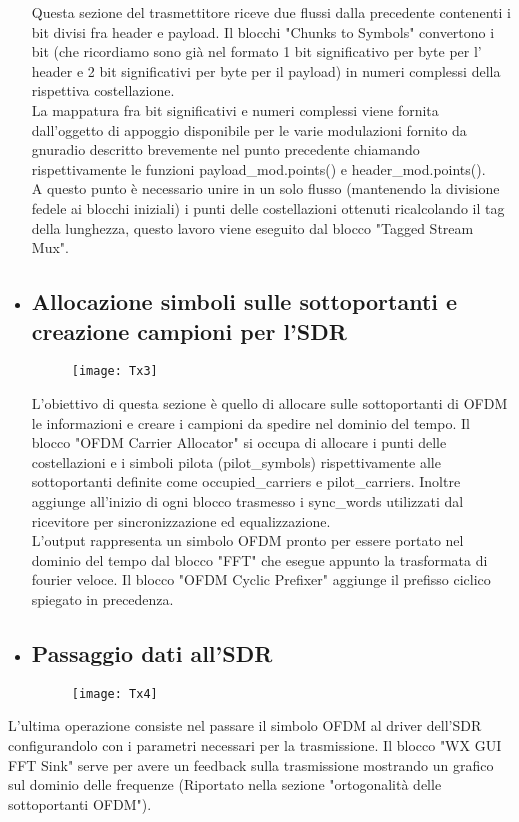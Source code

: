 \begin{itemize}
 Questa sezione del trasmettitore riceve due flussi dalla precedente contenenti i bit divisi fra header e payload. Il blocchi "Chunks to Symbols" convertono i bit (che ricordiamo sono già nel formato 1 bit significativo per byte per l' header e 2 bit significativi per byte per il payload) in numeri complessi della rispettiva costellazione.\\ La mappatura fra bit significativi e numeri complessi viene fornita dall'oggetto di appoggio disponibile per le varie modulazioni fornito da gnuradio descritto brevemente nel punto precedente chiamando rispettivamente le funzioni payload\_mod.points() e header\_mod.points().\\ A questo punto è necessario unire in un solo flusso (mantenendo la divisione fedele ai blocchi iniziali) i punti delle costellazioni ottenuti ricalcolando il tag della lunghezza, questo lavoro viene eseguito dal blocco "Tagged Stream Mux".
 	\item \subsection{Allocazione simboli sulle sottoportanti e creazione campioni per l'SDR}
 	\begin{figure}[h]
 		\raggedleft
 		\texttt{[image: Tx3]}
 		\caption{}
 	\end{figure}
 L'obiettivo di questa sezione è quello di allocare sulle sottoportanti di OFDM le informazioni e creare i campioni da spedire nel dominio del tempo. Il blocco "OFDM Carrier Allocator" si occupa di allocare i punti delle costellazioni e i simboli pilota (pilot\_symbols) rispettivamente alle sottoportanti definite come occupied\_carriers e pilot\_carriers. Inoltre aggiunge all'inizio di ogni blocco trasmesso i sync\_words utilizzati dal ricevitore per sincronizzazione ed equalizzazione. \\L'output rappresenta un simbolo OFDM pronto per essere portato nel dominio del tempo dal blocco  "FFT" che esegue appunto la trasformata di fourier veloce. Il blocco "OFDM Cyclic Prefixer" aggiunge il prefisso ciclico spiegato in precedenza.
 \newpage
 	\item \subsection{Passaggio dati all'SDR}
 	\begin{figure}[h]
 		\centering
 		\texttt{[image: Tx4]}
 		\caption{}
 	\end{figure}
 \end{itemize}
L'ultima operazione consiste nel passare il simbolo OFDM al driver dell'SDR configurandolo con i parametri necessari per la trasmissione. Il blocco "WX GUI FFT Sink" serve per avere un feedback sulla trasmissione mostrando un grafico sul dominio delle frequenze (Riportato nella sezione "ortogonalità delle sottoportanti OFDM").
